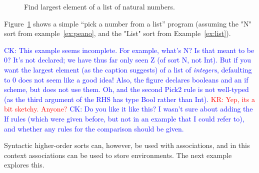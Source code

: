 \documentclass[letterpaper,11pt]{article}
\newcommand{\CK}[1]{\textcolor{blue}{CK: #1}}
\newcommand{\KR}[1]{\textcolor{red}{KR: #1}}
\begin{document}
\begin{figure}[h!t]
  \caption{Find largest element of a list of natural numbers.}
  \label{fig:pick}
\end{figure}

\begin{example}[]\label{ex:pick}
  Figure~\ref{fig:pick} shows a simple ``pick a number from a list'' program
  (assuming the "N" sort from example~\ref{ex:peano}, and the "List" sort from
  Example~\ref{ex:list}).

  \CK{This example seems incomplete.  For example, what's N? Is that meant to
  be 0? It's not declared; we have thus far only seen Z (of sort N, not Int).
  But if you want the largest element (as the caption suggests) of a list of
  \emph{integers}, defaulting to 0 does not seem like a good idea!  Also, the
  figure declares booleans and an if scheme, but does not use them.  Oh, and
  the second Pick2 rule is not well-typed (as the third argument of the RHS
  has type Bool rather than Int).}
  \KR{Yep, its a bit sketchy. Anyone?}
  \CK{Do you like it like this? I wasn't sure about adding the If rules (which
  were given before, but not in an example that I could refer to), and whether
  any rules for the comparison should be given.}
\end{example}

Syntactic higher-order sorts can, however, be used with associations, and in this context
associations can be used to store environments. The next example explores this.
\end{document}

